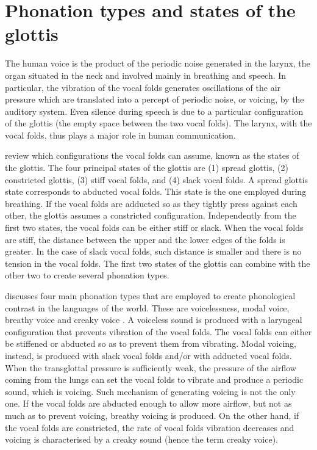 \documentclass[11pt,a4paper,oneside,openany]{memoir}\usepackage[]{graphicx}\usepackage[]{color}
\begin{document}
\section{Phonation types and states of the glottis}
\label{s:phonation}
The human voice is the product of the periodic noise generated in the larynx, the organ situated in the neck and involved mainly in breathing and speech.
In particular, the vibration of the vocal folds generates oscillations of the air pressure which are translated into a percept of periodic noise, or voicing, by the auditory system.
Even silence during speech is due to a particular configuration of the glottis (the empty space between the two vocal folds).
The larynx, with the vocal folds, thus plays a major role in human communication.

\citet{halle2002} review which configurations the vocal folds can assume, known as the states of the glottis.
The four principal states of the glottis are (1) spread glottis, (2) constricted glottis, (3) stiff vocal folds, and (4) slack vocal folds.
A spread glottis state corresponds to abducted vocal folds.
This state is the one employed during breathing.
If the vocal folds are adducted so as they tightly press against each other, the glottis assumes a constricted configuration.
Independently from the first two states, the vocal folds can be either stiff or slack.
When the vocal folds are stiff, the distance between the upper and the lower edges of the folds is greater.
In the case of slack vocal folds, such distance is smaller and there is no tension in the vocal folds.
The first two states of the glottis can combine with the other two to create several phonation types.

\citet{ladefoged1973} discusses four main phonation types that are employed to create phonological contrast in the languages of the world.
These are voicelessness, modal voice, breathy voice and creaky voice \citep{halle2002}.
A voiceless sound is produced with a laryngeal configuration that prevents vibration of the vocal folds.
The vocal folds can either be stiffened or abducted so as to prevent them from vibrating.
Modal voicing, instead, is produced with slack vocal folds and/or with adducted vocal folds.
When the transglottal pressure is sufficiently weak, the pressure of the airflow coming from the lungs can set the vocal folds to vibrate and produce a periodic sound, which is voicing.
Such mechanism of generating voicing is not the only one.
If the vocal folds are abducted enough to allow more airflow, but not as much as to prevent voicing, breathy voicing is produced.
On the other hand, if the vocal folds are constricted, the rate of vocal folds vibration decreases and voicing is characterised by a creaky sound (hence the term creaky voice).
\end{document}
